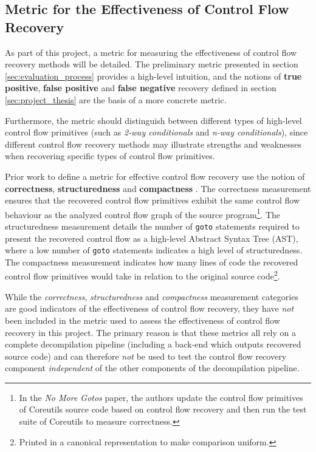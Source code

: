 
\subsection{Metric for the Effectiveness of Control Flow Recovery}
\label{sec:req_metric}

As part of this project, a metric for measuring the effectiveness of control flow recovery methods will be detailed. The preliminary metric presented in section \ref{sec:evaluation_process} provides a high-level intuition, and the notions of \textbf{true positive}, \textbf{false positive} and \textbf{false negative} recovery defined in section \ref{sec:project_thesis} are the basis of a more concrete metric.

Furthermore, the metric should distinguish between different types of high-level control flow primitives (such as \textit{2-way conditionals} and \textit{n-way conditionals}), since different control flow recovery methods may illustrate strengths and weaknesses when recovering specific types of control flow primitives.

Prior work to define a metric for effective control flow recovery use the notion of \textbf{correctness}, \textbf{structuredness} and \textbf{compactness} \cite{no_more_gotos}. The correctness measurement ensures that the recovered control flow primitives exhibit the same control flow behaviour as the analyzed control flow graph of the source program\footnote{In the \textit{No More Gotos} paper, the authors update the control flow primitives of Coreutils source code based on control flow recovery and then run the test suite of Coreutils to measure correctness.}. The structuredness measurement details the number of \texttt{goto} statements required to present the recovered control flow as a high-level Abstract Syntax Tree (AST), where a low number of \texttt{goto} statements indicates a high level of structuredness. The compactness measurement indicates how many lines of code the recovered control flow primitives would take in relation to the original source code\footnote{Printed in a canonical representation to make comparison uniform.}.

While the \textit{correctness}, \textit{structuredness} and \textit{compactness} measurement categories are good indicators of the effectiveness of control flow recovery, they have \textit{not} been included in the metric used to assess the effectiveness of control flow recovery in this project. The primary reason is that these metrics all rely on a complete decompilation pipeline (including a back-end which outputs recovered source code) and can therefore \textit{not} be used to test the control flow recovery component \textit{independent} of the other components of the decompilation pipeline.


